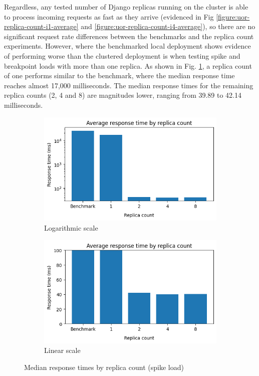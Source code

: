 Regardless, any tested number of Django replicas running on the cluster is able to process incoming requests as fast as they arrive (evidenced in Fig \ref{figure:uor-replica-count-i1-average} and \ref{figure:uor-replica-count-i4-average}), so there are no significant request rate differences between the benchmarks and the replica count experiments. However, where the benchmarked local deployment shows evidence of performing worse than the clustered deployment is when testing spike and breakpoint loads with more than one replica. As shown in Fig. \ref{figure:uor-replica-count-rt-comp-spike}, a replica count of one performs similar to the benchmark, where the median response time reaches almost 17,000 milliseconds. The median response times for the remaining replica counts (2, 4 and 8) are magnitudes lower, ranging from 39.89 to 42.14 milliseconds.

\begin{figure}[h]
    \centering
    \begin{subfigure}{.5\textwidth}
      \centering
      \includegraphics[width=\linewidth]{figures/uor-replica-count-rt-comp-spike1.png}
      \caption{Logarithmic scale}
    \end{subfigure}%
    \begin{subfigure}{.5\textwidth}
      \centering
      \includegraphics[width=\linewidth]{figures/uor-replica-count-rt-comp-spike2.png}
      \caption{Linear scale}
    \end{subfigure}

    \caption{Median response times by replica count (spike load)}
    \label{figure:uor-replica-count-rt-comp-spike}
\end{figure}

